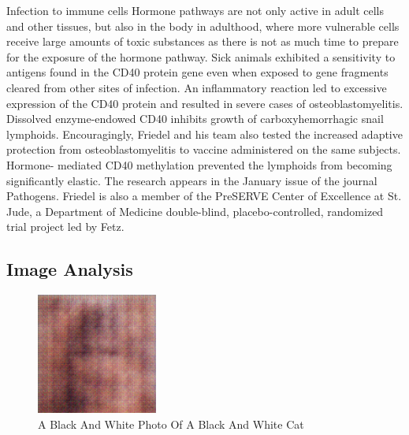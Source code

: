 \documentclass{article}%
\begin{document}
Infection to immune cells\newline%
Hormone pathways are not only active in adult cells and other tissues, but also in the body in adulthood, where more vulnerable cells receive large amounts of toxic substances as there is not as much time to prepare for the exposure of the hormone pathway. Sick animals exhibited a sensitivity to antigens found in the CD40 protein gene even when exposed to gene fragments cleared from other sites of infection.\newline%
An inflammatory reaction led to excessive expression of the CD40 protein and resulted in severe cases of osteoblastomyelitis. Dissolved enzyme{-}endowed CD40 inhibits growth of carboxyhemorrhagic snail lymphoids.\newline%
Encouragingly, Friedel and his team also tested the increased adaptive protection from osteoblastomyelitis to vaccine administered on the same subjects. Hormone{-} mediated CD40 methylation prevented the lymphoids from becoming significantly elastic.\newline%
The research appears in the January issue of the journal Pathogens. Friedel is also a member of the PreSERVE Center of Excellence at St. Jude, a Department of Medicine double{-}blind, placebo{-}controlled, randomized trial project led by Fetz.

%
\subsection{Image Analysis}%
\label{subsec:ImageAnalysis}%


\begin{figure}[h!]%
\centering%
\includegraphics[width=150px]{500_fake_images/samples_5_85.png}%
\caption{A Black And White Photo Of A Black And White Cat}%
\end{figure}

%
\end{document}
